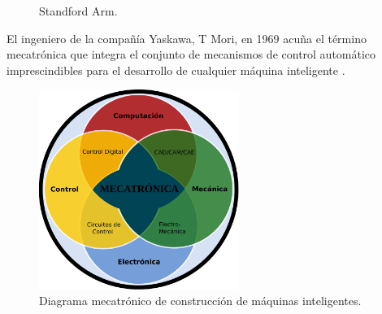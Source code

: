   \begin{figure}[h!]
    \begin{center}
      \subcapcentertrue
      \hspace{2mm}
    \end{center}
    \caption{Standford Arm.}
    \label{fig:standford_arm}
  \end{figure}
 
El ingeniero de la compañía Yaskawa, T Mori, en 1969 acuña el término mecatrónica que integra el conjunto de mecanismos de control automático imprescindibles para el desarrollo de cualquier máquina inteligente \cite{Sanchez07b}.
  
  \begin{figure} [h!]
    \begin{center}
      \includegraphics[width=65mm]{figs/meca.png}
    \end{center}
    \caption{Diagrama mecatrónico de construcción de máquinas inteligentes.}
    \label{fig:Mecatrónica}
  \end{figure}
  
